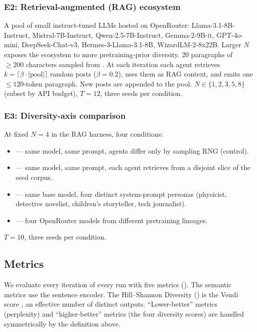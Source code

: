 \subsubsection{E2: Retrieval-augmented (RAG) ecosystem}
\label{sec:e2}

 A pool of small instruct-tuned LLMs hosted on
OpenRouter: Llama-3.1-8B-Instruct, Mistral-7B-Instruct,
Qwen-2.5-7B-Instruct, Gemma-2-9B-it, GPT-4o-mini,
DeepSeek-Chat-v3, Hermes-3-Llama-3.1-8B, WizardLM-2-8x22B.
Larger $N$ exposes the ecosystem to more pretraining-prior
diversity.
 20 paragraphs of $\geq 200$ characters sampled
from \wikitext.
 At each iteration each agent retrieves
$k = \lceil \beta \cdot |\mathrm{pool}| \rceil$ random posts
($\beta = 0.2$), uses them as RAG context, and emits one $\leq 120$-token
paragraph. New posts are appended to the pool.
 $N \in \{1, 2, 3, 5, 8\}$ (subset by API budget),
$T = 12$, three seeds per condition.

\subsubsection{E3: Diversity-axis comparison}
\label{sec:e3}

At fixed $N{=}4$ in the RAG harness, four conditions:
\begin{itemize}[leftmargin=*,itemsep=0pt,topsep=0pt]
    \item \axisseed --- same model, same prompt, agents differ only
    by sampling RNG (control).
    \item \axisdata --- same model, same prompt, each agent retrieves
    from a disjoint slice of the seed corpus.
    \item \axisprompt --- same base model, four distinct system-prompt
    personas (physicist, detective novelist, children's storyteller,
    tech journalist).
    \item \axisfamily --- four OpenRouter models from different
    pretraining lineages.
\end{itemize}
$T = 10$, three seeds per condition.

\subsection{Metrics}
\label{sec:metrics}

We evaluate every iteration of every run with five metrics
(). The semantic metrics use the
\minilm sentence encoder. The Hill--Shannon Diversity (\hsd) is the
Vendi score \citep{friedman2023vendi}, an effective number of distinct
outputs. ``Lower-better'' metrics (perplexity) and
``higher-better'' metrics (the four diversity scores) are handled
symmetrically by the \mvp definition above.

